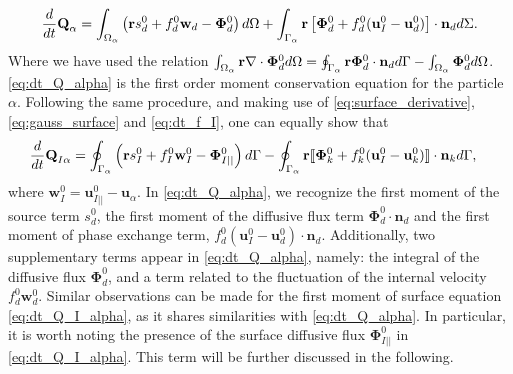 \begin{align}
    \frac{d}{dt} \textbf{Q}_\alpha
    = \int_{\Omega_\alpha} \left( 
        \textbf{r} s_d^0  
        + f_d^0  \textbf{w}_d 
        - \bm\Phi_d^0
    \right)  d\Omega
    + \int_{\Gamma_\alpha} \textbf{r} \left[
        \bm\Phi_d^0
        + f_d^0 (\textbf{u}_I^0-\textbf{u}_d^0)
    \right]\cdot \textbf{n}_d  d\Sigma.
    \label{eq:dt_Q_alpha}
\end{align}
Where we have used the relation $\int_{\Omega_\alpha} \textbf{r}  \mathbf{\nabla}\cdot \bm\Phi_d^0  d\Omega
= \oint_{\Gamma_\alpha}  \textbf{r} \bm\Phi_d^0 \cdot \textbf{n}_d  d\Gamma
- \int_{\Omega_\alpha}  \bm\Phi_d^0  d\Omega$. 
\ref{eq:dt_Q_alpha} is the first order moment conservation equation for the particle $\alpha$. 
Following the same procedure, and making use of \ref{eq:surface_derivative}, \ref{eq:gauss_surface} and \ref{eq:dt_f_I}, one can equally show that 
\begin{align}
    \frac{d}{dt} {\textbf{Q}_{I\alpha}}
    &= \oint_{\Gamma_\alpha}  \left(
        \textbf{r}s_I^0
        + f_I^0 \textbf{w}_I^0
        - \mathbf{\Phi}_{I||}^0
    \right)  d\Gamma
    - \oint_{\Gamma_\alpha} \textbf{r} 
    \llbracket \mathbf{\Phi}_k^0
        + f_k^0 (\textbf{u}_I^0 - \textbf{u}_k^0)
     \rrbracket \cdot \textbf{n}_k
     d\Gamma,
    \label{eq:dt_Q_I_alpha}
\end{align}
where $\textbf{w}_I^0 = \textbf{u}_{I||}^0 - \textbf{u}_\alpha$.
In \ref{eq:dt_Q_alpha}, we recognize the first moment of the source term $s_d^0$, the first moment of the diffusive flux term $\bm\Phi_d^0\cdot\textbf{n}_d$ and the first moment of phase exchange term, $f_d^0 (\textbf{u}_I^0-\textbf{u}_d^0)\cdot\textbf{n}_d$. 
Additionally, two supplementary terms appear in \ref{eq:dt_Q_alpha}, namely: the integral of the diffusive flux $\bm\Phi_d^0$, and a term related to the fluctuation of the internal velocity $f_d^0 \textbf{w}_d^0$.
Similar observations can be made for the first moment of surface equation \ref{eq:dt_Q_I_alpha}, as it shares similarities with \ref{eq:dt_Q_alpha}. 
In particular, it is worth noting the presence of the surface diffusive flux $\mathbf{\Phi}_{I||}^0$ in \ref{eq:dt_Q_I_alpha}.
This term will be further discussed in the following. 

